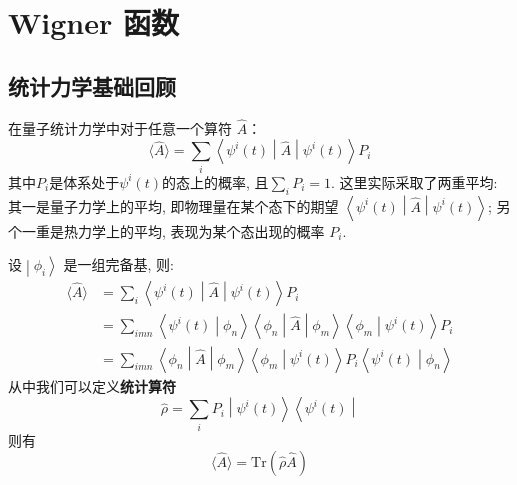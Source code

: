 \chapter{Wigner 函数}
    \section{统计力学基础回顾}

        在量子统计力学中对于任意一个算符 $\hat{A}$：
        \begin{equation}
            \langle {\hat{A}} \rangle = \sum_i \left\langle {\psi^{i}(t)} \middle| {\hat{A}} \middle| {\psi^{i}(t)} \right\rangle P_{i}
        \end{equation}
        其中$P_i$是体系处于$\psi^{i}(t)$的态上的概率, 且$\sum_i P_i = 1$. 
        这里实际采取了两重平均: 其一是量子力学上的平均, 即物理量在某个态下的期望
        $\left\langle {\psi^{i}(t)} \middle| {\hat{A}} \middle| {\psi^{i}(t)} \right\rangle$; 
        另个一重是热力学上的平均, 表现为某个态出现的概率 $P_{i}$. 

        设$\left. \middle| {\phi_{i}} \right\rangle$ 是一组完备基, 则:
        \begin{equation}\begin{aligned}
            \langle {\hat{A}} \rangle
            &= \sum_i \left\langle {\psi^{i}(t)} \middle| {\hat{A}} \middle| {\psi^{i}(t)} \right\rangle P_{i}
            \\
            &= \sum_{imn} \left\langle {\psi^{i}(t)} \middle| {\phi_{n}} \right\rangle \left\langle {\phi_{n}} \middle| {\hat{A}} \middle| {\phi_{m}} \right\rangle \left\langle {\phi_{m}} \middle| {\psi^{i}(t)} \right\rangle P_{i}
            \\
            &= \sum_{imn} \left\langle {\phi_{n}} \middle| {\hat{A}} \middle| {\phi_{m}} \right\rangle 
            \left\langle {\phi_{m}} \middle| {\psi^{i}(t)} \right\rangle P_{i}
            \left\langle {\psi^{i}(t)} \middle| {\phi_{n}} \right\rangle
        \end{aligned}\end{equation}
        从中我们可以定义\textbf{统计算符}
        \begin{equation}
            \hat{\rho} = \sum_i P_{i} \left. \middle| {\psi^{i}(t)} \right\rangle \left\langle {\psi^{i}(t)} \middle| \right.
        \end{equation}
        则有
        \begin{equation}
            \langle {\hat{A}} \rangle = \mathrm{Tr}(\hat{\rho}\hat{A})
        \end{equation}

